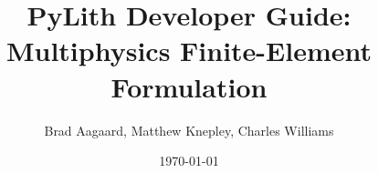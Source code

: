 \documentclass{pylithdoc}
\author{Brad Aagaard, Matthew Knepley, Charles Williams}
\title{PyLith Developer Guide: Multiphysics Finite-Element Formulation}
\date{\today}
\begin{document}
\maketitle

\frontmatter
\tableofcontents{}
\listoffigures
\listoftables

\mainmatter\raggedbottom




\end{document}
